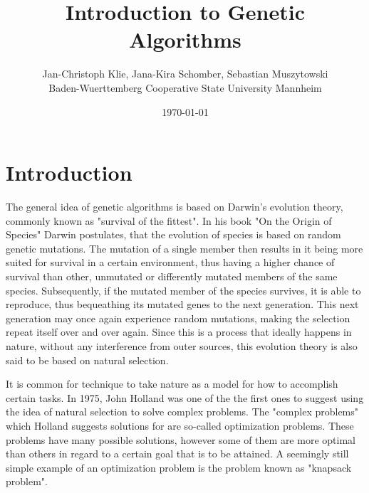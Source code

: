 \documentclass[11pt,a4paper]{article}
\title{Introduction to Genetic Algorithms}
\date{\today}
\author{Jan-Christoph Klie, Jana-Kira Schomber, Sebastian Muszytowski \\Baden-Wuerttemberg Cooperative State University Mannheim }
\begin{document}
\maketitle


\section{Introduction}

The general idea of genetic algorithms is based on Darwin's evolution theory, commonly known as "survival of the fittest". In his book "On the Origin of Species" Darwin postulates, that the evolution of species is based on random genetic mutations. The mutation of a single member then results in it being more suited for survival in a certain environment, thus having a higher chance of survival than other, unmutated or differently mutated members of the same species. Subsequently, if the mutated member of the species survives, it is able to reproduce, thus bequeathing its mutated genes to the next generation. This next generation may once again experience random mutations, making the selection repeat itself over and over again.\cite{0691026157} Since this is a process that ideally happens in nature, without any interference from outer sources, this evolution theory is also said to be based on natural selection.

It is common for technique to take nature as a model for how to accomplish certain tasks. In 1975, John Holland was one of the the first ones to suggest using the idea of natural selection to solve complex problems. \cite{9783540731894} The "complex problems" which Holland suggests solutions for are so-called optimization problems. These problems have many possible solutions, however some of them are more optimal than others in regard to a certain goal that is to be attained. A seemingly still simple example of an optimization problem is the problem known as "knapsack problem". 
\end{document}
